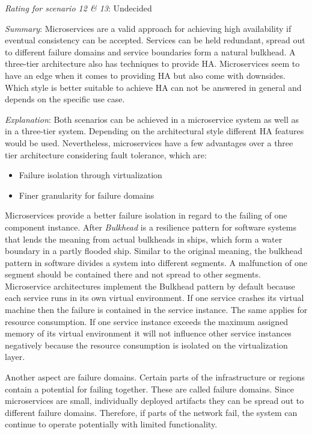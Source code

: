 \textit{Rating for scenario 12 \& 13}: Undecided

\textit{Summary}:
Microservices are a valid approach for achieving high availability if eventual consistency can be accepted.
Services can be held redundant, spread out to different failure domains and service boundaries form a natural bulkhead.
A three-tier architecture also has techniques to provide \ac{HA}.
Microservices seem to have an edge when it comes to providing \ac{HA} but also come with downsides.
Which style is better suitable to achieve \ac{HA} can not be answered in general and depends on the specific use case.

\textit{Explanation}:
Both scenarios can be achieved in a microservice system as well as in a three-tier system.
Depending on the architectural style different \ac{HA} features would be used.
Nevertheless, microservices have a few advantages over a three tier architecture considering fault tolerance, which are:
\begin{itemize}
\item Failure isolation through virtualization
\item Finer granularity for failure domains
\end{itemize}

Microservices provide a better failure isolation in regard to the failing of one component instance.
After \citep[p. 209]{Wolff2016} \textit{Bulkhead} is a resilience pattern for software systems that lends the meaning from actual bulkheads in ships, which form a water boundary in a partly flooded ship.
Similar to the original meaning, the bulkhead pattern in software divides a system into different segments.
A malfunction of one segment should be contained there and not spread to other segments.
Microservice architectures implement the Bulkhead pattern by default because each service runs in its own virtual environment.
If one service crashes its virtual machine then the failure is contained in the service instance.
The same applies for resource consumption.
If one service instance exceeds the maximum assigned memory of its virtual environment it will not influence other service instances negatively because the resource consumption is isolated on the virtualization layer.

Another aspect are failure domains.
Certain parts of the infrastructure or regions contain a potential for failing together.
These are called failure domains.
Since microservices are small, individually deployed artifacts they can be spread out to different failure domains.
Therefore, if parts of the network fail, the system can continue to operate potentially with limited functionality.

